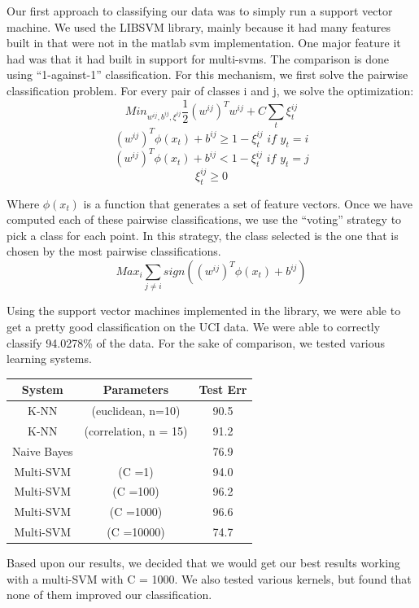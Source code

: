 \documentclass{article} %
\begin{document}
Our first approach to classifying our data was to simply run a support vector machine. We used the LIBSVM library, mainly because it had many features built in that were not in the matlab svm implementation. One major feature it had was that it had built in support for multi-svms. The comparison is done using “1-against-1” classification. For this mechanism, we first solve the pairwise classification problem. For every pair of classes i and j, we solve the optimization:
$$Min_{w^{ij}, b^{ij},\xi^{ij}}  \frac{1}{2} (w^{ij})^T w^{ij} + C\sum_t \xi^{ij}_t $$
$$(w^{ij})^T\phi(x_t) + b^{ij} \geq 1- \xi^{ij}_t\textit{ if }y_t  = i$$
$$(w^{ij})^T \phi(x_t) + b^{ij} < 1- \xi^{ij}_t\textit{ if }y_t  = j$$
$$\xi^{ij}_t \geq 0$$

Where $\phi(x_t)$ is a function that generates a set of feature vectors. Once we have computed each of these pairwise classifications, we use the “voting” strategy to pick a class for each point. In this strategy, the class selected is the one that is chosen by the most pairwise classifications.
$$Max_i \sum_{j \not = i} sign((w^{ij})^T \phi(x_t) + b^{ij})$$

Using the support vector machines implemented in the library, we were able to get a pretty good classification on the UCI data. We were able to correctly classify 94.0278\% of the data. For the sake of comparison, we tested various learning systems.

\begin{tabular}{ |c | c c | }
\hline
System & Parameters & Test Err \\
\hline
K-NN           & (euclidean, n=10)    &  90.5\\
K-NN           & (correlation, n = 15)& 91.2\\
Naive Bayes &                              & 76.9 \\
Multi-SVM    &  (C =1)                    &  94.0 \\
Multi-SVM    &  (C =100)                 &  96.2 \\
Multi-SVM    &  (C =1000)                 &  96.6 \\
Multi-SVM    &  (C =10000)                 &  74.7 \\
\hline
\end{tabular}

Based upon our results, we decided that we would get our best results working with a multi-SVM
with C = 1000. 
We also tested various kernels, but found that none of them improved our classification.
\end{document}

